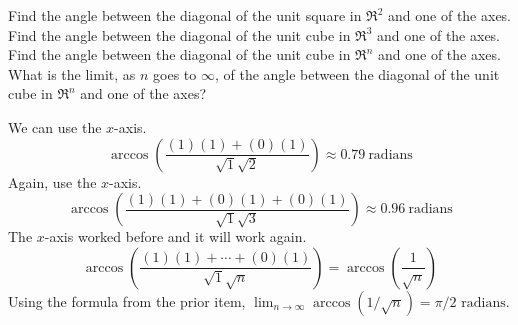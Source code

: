 
\begin{Exercise}[
name={},
title={}, 
difficulty=0,
origin={\cite{JH}}]
\Question  Find the angle between the diagonal of the unit square in
        \( \Re^2 \) and one of the axes.
\Question  Find the angle between the diagonal of the unit cube in
        \( \Re^3 \) and one of the axes.
\Question  Find the angle between the diagonal of the unit cube in
        \( \Re^n \) and one of the axes.
\Question  What is the limit, as \( n \) goes to \( \infty \),
        of the angle between the diagonal of the unit cube in \( \Re^n \)
        and one of the axes?
\end{Exercise}

\begin{Answer}
\Question We can use the \( x \)-axis.
          \begin{equation*}
            \arccos (\frac{(1)(1)+(0)(1)}{\sqrt{1}\sqrt{2}})
            \approx 0.79~\text{radians}
          \end{equation*}
\Question Again, use the \( x \)-axis.
          \begin{equation*}
            \arccos (\frac{(1)(1)+(0)(1)+(0)(1)}{\sqrt{1}\sqrt{3}})
            \approx 0.96~\text{radians}
          \end{equation*}
\Question The \( x \)-axis worked before and it will work again.
          \begin{equation*}
            \arccos (\frac{(1)(1)+\cdots+(0)(1)}{\sqrt{1}\sqrt{n}})
            =\arccos (\frac{1}{\sqrt{n}})
          \end{equation*}
\Question Using the formula from the prior item,
            $\lim_{n\to\infty} \arccos(1/\sqrt{n})
              =\pi/2\text{\ radians}$.
\end{Answer}
